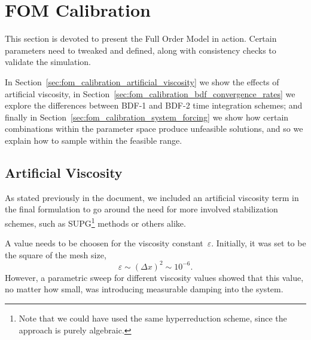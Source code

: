 \documentclass[../../thesis.tex]{subfiles}
\begin{document}
\section{FOM Calibration}
\label{sec:fom_calibration}
This section is devoted to present the Full Order Model in action.
Certain parameters need to tweaked and defined,
along with consistency checks to validate the simulation.

In Section~\ref{sec:fom_calibration_artificial_viscosity} we show the effects of artificial viscosity,
in Section~\ref{sec:fom_calibration_bdf_convergence_rates} we explore the differences 
between BDF-1 and BDF-2 time integration schemes;
and finally in Section~\ref{sec:fom_calibration_system_forcing} we show how
certain combinations within the parameter space produce unfeasible solutions, 
and so we explain how to sample within the feasible range.

\subsection{Artificial Viscosity}
\label{sec:fom_calibration_artificial_viscosity}
As stated previously in the document, 
we included an artificial viscosity term in the final formulation
to go around the need for more involved stabilization schemes, such as SUPG\footnote{
Note that we could have used the same hyperreduction scheme,
since the approach is purely algebraic.} 
methods or others alike.

A value needs to be choosen for the viscosity constant~$\varepsilon$.
Initially, it was set to be the square of the mesh size, 
\begin{equation*}
    \varepsilon \sim (\Delta x)^2 \sim 10^{-6}.
\end{equation*}
However, a parametric sweep for different viscosity values showed that
this value, 
no matter how small, was introducing measurable damping into the system.
\end{document}
